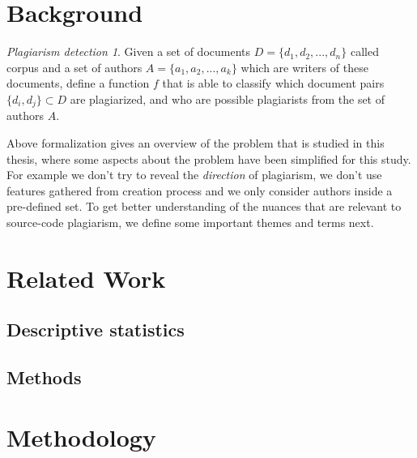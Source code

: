\documentclass[english, grading]{tktltiki2}
\theoremstyle{definition}
\theoremstyle{remark}
\numberwithin{equation}{section} %
\begin{document}
\section{Background}

\newtheorem*{sc-plg}{Plagiarism detection}
\begin{sc-plg}
Given a set of documents $D = \{d_1, d_2, ..., d_n\}$ called corpus and a set of authors $A = \{a_1, a_2, ..., a_k\}$ which are writers of these documents, define a function $f$ that is able to classify which document pairs $\{d_i, d_j\} \subset D$ are plagiarized, and who are possible plagiarists from the set of authors $A$.
\end{sc-plg}

Above formalization gives an overview of the problem that is studied in this thesis, where some aspects about the problem have been simplified for this study. For example we don't try to reveal the \emph{direction} of plagiarism, we don't use features gathered from creation process and we only consider authors inside a pre-defined set. To get better understanding of the nuances that are relevant to source-code plagiarism, we define some important themes and terms next.



\newpage

\section{Related Work}


\subsection{Descriptive statistics}


\subsection{Methods}


%



\section{Methodology}
\end{document}
